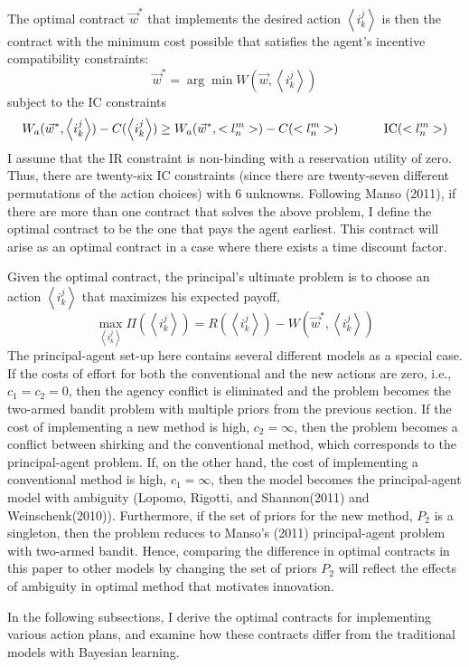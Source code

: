 \documentclass[11pt]{article} %
\theoremstyle{exampstyle}
\newcommand{\be}{\begin{equation}}
\newcommand{\ee}{\end{equation}}
\newcommand{\la}{ \left < }
\newcommand{\ra}{ \right > }
\begin{document}
The optimal contract $\vec{w}^* $ that implements the desired action $ \la i^j_k \ra$ is then the contract with the minimum cost possible that satisfies the agent's incentive compatibility constraints:
\[ \vec{w}^* = \arg\min W(\vec{w}, \la i^j_k \ra)  \]
%
subject to the IC constraints
\[ W_a(\vec{w}^*, \la i^j_k \ra)  - C(\la i^j_k \ra) \ge W_a(\vec{w}^*, <l^m_n>)  - C(<l^m_n>) \hspace{.5in} \text{IC$(<l^m_n>)$} \]
%
I assume that the IR constraint is non-binding with a reservation utility of zero. Thus, there are twenty-six IC constraints (since there are twenty-seven different permutations of the action choices) with 6 unknowns. Following Manso (2011), if there are more than one contract that solves the above problem,  I define the optimal contract to be the one that pays the agent earliest. This contract will arise as an optimal contract in a case where there exists a time discount factor. 

Given the optimal contract, the principal's ultimate problem is to choose an action $\la i^j_k \ra$ that maximizes his expected payoff,
\be
\max_{\la i^j_k \ra} { \Pi(\la i^j_k \ra) = R(\la i^j_k \ra) -  W(\vec{w}^*, \la i^j_k \ra) }
\ee
%
The principal-agent set-up here contains several different models as a special case. If the costs of effort for both the conventional and the new actions are zero, i.e., $c_1=c_2=0$, then the agency conflict is eliminated and the problem becomes the two-armed bandit problem with multiple priors from the previous section. If the cost of implementing a new method is high, $c_2= \infty $, then the problem becomes a conflict between shirking and the conventional method, which corresponds to the principal-agent problem. If, on the other hand, the cost of implementing a conventional method is high, $c_1=\infty$, then the model becomes the principal-agent model with ambiguity (\nocite{LRS:2011}Lopomo, Rigotti, and Shannon(2011) and \nocite{wein:2010} Weinschenk(2010)). Furthermore, if the set of priors for the new method, $P_2$ is a singleton, then the problem reduces to Manso's (2011) principal-agent problem with two-armed bandit. Hence, comparing the difference in optimal contracts in this paper to other models by changing the set of priors $P_2$ will reflect the effects of ambiguity in optimal method that motivates innovation.

In the following subsections, I derive the optimal contracts for implementing various action plans, and examine how these contracts differ from the traditional models with Bayesian learning.
\end{document}
